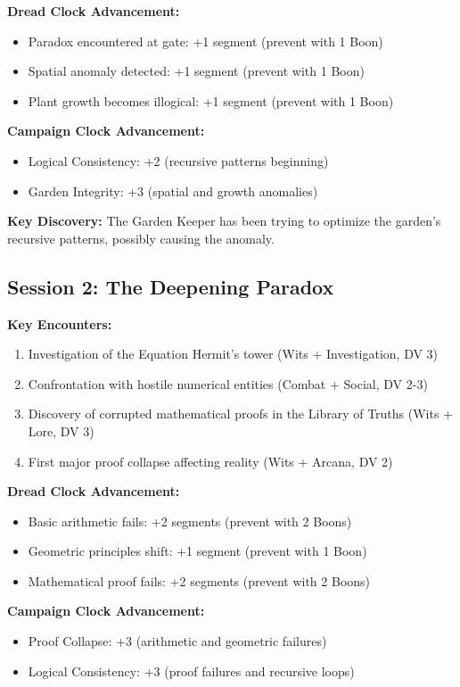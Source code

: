 \documentclass[11pt]{article}
\begin{document}
\textbf{Dread Clock Advancement:}
\begin{itemize}
\item Paradox encountered at gate: +1 segment (prevent with 1 Boon)
\item Spatial anomaly detected: +1 segment (prevent with 1 Boon)
\item Plant growth becomes illogical: +1 segment (prevent with 1 Boon)
\end{itemize}

\textbf{Campaign Clock Advancement:}
\begin{itemize}
\item Logical Consistency: +2 (recursive patterns beginning)
\item Garden Integrity: +3 (spatial and growth anomalies)
\end{itemize}

\textbf{Key Discovery:} The Garden Keeper has been trying to optimize the garden's recursive patterns, possibly causing the anomaly.

\subsection{Session 2: The Deepening Paradox}

\textbf{Key Encounters:}
\begin{enumerate}
\item Investigation of the Equation Hermit's tower (Wits + Investigation, DV 3)
\item Confrontation with hostile numerical entities (Combat + Social, DV 2-3)
\item Discovery of corrupted mathematical proofs in the Library of Truths (Wits + Lore, DV 3)
\item First major proof collapse affecting reality (Wits + Arcana, DV 2)
\end{enumerate}

\textbf{Dread Clock Advancement:}
\begin{itemize}
\item Basic arithmetic fails: +2 segments (prevent with 2 Boons)
\item Geometric principles shift: +1 segment (prevent with 1 Boon)
\item Mathematical proof fails: +2 segments (prevent with 2 Boons)
\end{itemize}

\textbf{Campaign Clock Advancement:}
\begin{itemize}
\item Proof Collapse: +3 (arithmetic and geometric failures)
\item Logical Consistency: +3 (proof failures and recursive loops)
\end{itemize}
\end{document}
